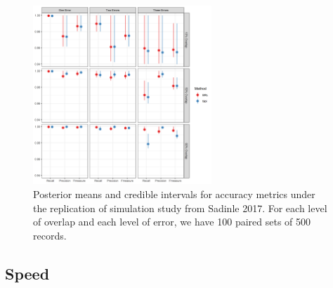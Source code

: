 \documentclass[12pt,letterpaper]{article}
\newcommand{\1}[1]{\mathbb{I}\!\left[#1\right]} %
\begin{document}
%	


\begin{figure}[htbp]
\begin{center}
\includegraphics[width=0.6\textwidth]{../notes/figures/sadinle_sim_plot} 
\caption{Posterior means and credible intervals for accuracy metrics under the replication of simulation study from Sadinle 2017. For each level of overlap and each level of error, we have 100 paired sets of 500 records.}
\label{fig:sadinle_simulation}
\end{center}
\end{figure}

%
%	
%		
%	
%	

\hypertarget{speed}{%
	\subsection{Speed}\label{speed}}
	
\end{document}
